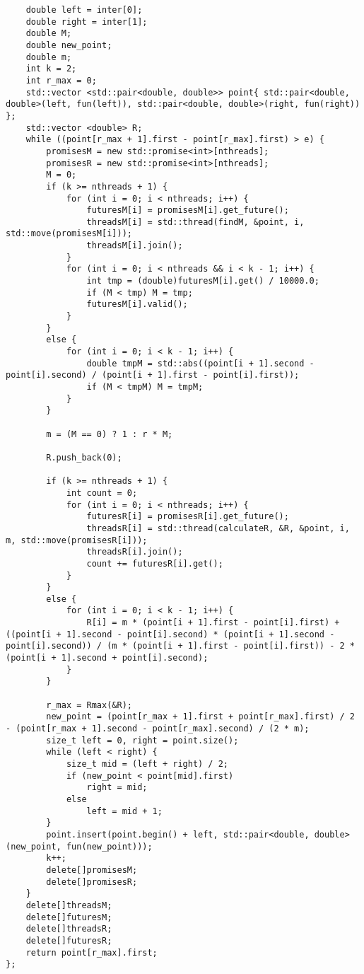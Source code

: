 \documentclass{report}
\begin{document}
\begin{lstlisting}
    double left = inter[0];
    double right = inter[1];
    double M;
    double new_point;
    double m;
    int k = 2;
    int r_max = 0;
    std::vector <std::pair<double, double>> point{ std::pair<double, double>(left, fun(left)), std::pair<double, double>(right, fun(right)) };
    std::vector <double> R;
    while ((point[r_max + 1].first - point[r_max].first) > e) {
        promisesM = new std::promise<int>[nthreads];
        promisesR = new std::promise<int>[nthreads];
        M = 0;
        if (k >= nthreads + 1) {
            for (int i = 0; i < nthreads; i++) {
                futuresM[i] = promisesM[i].get_future();
                threadsM[i] = std::thread(findM, &point, i, std::move(promisesM[i]));
                threadsM[i].join();
            }
            for (int i = 0; i < nthreads && i < k - 1; i++) {
                int tmp = (double)futuresM[i].get() / 10000.0;
                if (M < tmp) M = tmp;
                futuresM[i].valid();
            }
        }
        else {
            for (int i = 0; i < k - 1; i++) {
                double tmpM = std::abs((point[i + 1].second - point[i].second) / (point[i + 1].first - point[i].first));
                if (M < tmpM) M = tmpM;
            }
        }

        m = (M == 0) ? 1 : r * M;

        R.push_back(0);

        if (k >= nthreads + 1) {
            int count = 0;
            for (int i = 0; i < nthreads; i++) {
                futuresR[i] = promisesR[i].get_future();
                threadsR[i] = std::thread(calculateR, &R, &point, i, m, std::move(promisesR[i]));
                threadsR[i].join();
                count += futuresR[i].get();
            }
        }
        else {
            for (int i = 0; i < k - 1; i++) {
                R[i] = m * (point[i + 1].first - point[i].first) + ((point[i + 1].second - point[i].second) * (point[i + 1].second - point[i].second)) / (m * (point[i + 1].first - point[i].first)) - 2 * (point[i + 1].second + point[i].second);
            }
        }

        r_max = Rmax(&R);
        new_point = (point[r_max + 1].first + point[r_max].first) / 2 - (point[r_max + 1].second - point[r_max].second) / (2 * m);
        size_t left = 0, right = point.size();
        while (left < right) {
            size_t mid = (left + right) / 2;
            if (new_point < point[mid].first)
                right = mid;
            else
                left = mid + 1;
        }
        point.insert(point.begin() + left, std::pair<double, double>(new_point, fun(new_point)));
        k++;
        delete[]promisesM;
        delete[]promisesR;
    }
    delete[]threadsM;
    delete[]futuresM;
    delete[]threadsR;
    delete[]futuresR;
    return point[r_max].first;
};


\end{lstlisting}
\end{document}
